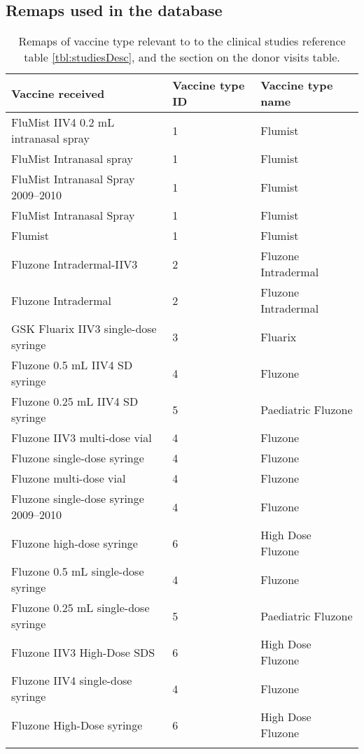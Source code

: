 \printbibliography

\begin{appendices}
    \section{Remaps used in the database}

    \begin{table}[h]
        \begin{tabular}{lll}
            \toprule{}
            Vaccine received & Vaccine type ID & Vaccine type name \\
            \midrule{}
            FluMist IIV4 0.2 mL intranasal spray & 1 & Flumist \\
            FluMist Intranasal spray & 1 & Flumist \\
            FluMist Intranasal Spray 2009–2010 & 1 & Flumist \\
            FluMist Intranasal Spray & 1 & Flumist \\
            Flumist & 1 & Flumist \\
            Fluzone Intradermal-IIV3 & 2 & Fluzone Intradermal \\
            Fluzone Intradermal & 2 & Fluzone Intradermal \\
            GSK Fluarix IIV3 single-dose syringe & 3 & Fluarix \\
            Fluzone 0.5 mL IIV4 SD syringe & 4 & Fluzone \\
            Fluzone 0.25 mL IIV4 SD syringe & 5 & Paediatric Fluzone \\
            Fluzone IIV3 multi-dose vial & 4 & Fluzone \\
            Fluzone single-dose syringe & 4 & Fluzone \\
            Fluzone multi-dose vial & 4 & Fluzone \\
            Fluzone single-dose syringe 2009–2010 & 4 & Fluzone \\
            Fluzone high-dose syringe & 6 & High Dose Fluzone \\
            Fluzone 0.5 mL single-dose syringe & 4 & Fluzone \\
            Fluzone 0.25 mL single-dose syringe & 5 & Paediatric Fluzone \\
            Fluzone IIV3 High-Dose SDS & 6 & High Dose Fluzone \\
            Fluzone IIV4 single-dose syringe & 4 & Fluzone \\
            Fluzone High-Dose syringe & 6 & High Dose Fluzone \\
            \bottomrule{}
        \end{tabular}
        \caption{Remaps of vaccine type relevant to to the clinical studies
        reference table \autoref{tbl:studiesDesc}, and the section on the donor
        visits table.}\label{tbl:remapVaccine}
    \end{table}


\end{appendices}
